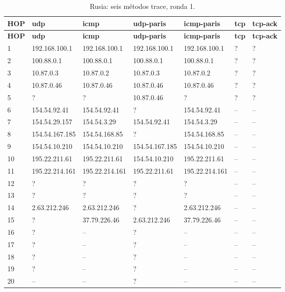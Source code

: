 \begin{landscape}
\begingroup
\fontsize{9}{11}\selectfont
\begin{longtable}{p{0.95cm}p{3.725cm}p{3.725cm}p{3.725cm}p{3.725cm}p{3.725cm}p{3.725cm}}
\caption{Rusia: seis métodos trace, ronda 1.}\label{anexo:trace:37.79.226.46:1} \\
\toprule
\textbf{HOP} & \textbf{udp} & \textbf{icmp} & \textbf{udp-paris} & \textbf{icmp-paris} & \textbf{tcp} & \textbf{tcp-ack} \\ \midrule
\endfirsthead
\toprule
\textbf{HOP} & \textbf{udp} & \textbf{icmp} & \textbf{udp-paris} & \textbf{icmp-paris} & \textbf{tcp} & \textbf{tcp-ack} \\ \midrule
\endhead
1 & 192.168.100.1 & 192.168.100.1 & 192.168.100.1 & 192.168.100.1 & ? & ? \\
2 & 100.88.0.1 & 100.88.0.1 & 100.88.0.1 & 100.88.0.1 & ? & ? \\
3 & 10.87.0.3 & 10.87.0.2 & 10.87.0.3 & 10.87.0.2 & ? & ? \\
4 & 10.87.0.46 & 10.87.0.46 & 10.87.0.46 & 10.87.0.46 & ? & ? \\
5 & ? & ? & 10.87.0.46 & ? & ? & ? \\
6 & 154.54.92.41 & 154.54.92.41 & ? & 154.54.92.41 & -- & -- \\
7 & 154.54.29.157 & 154.54.3.29 & 154.54.92.41 & 154.54.3.29 & -- & -- \\
8 & 154.54.167.185 & 154.54.168.85 & ? & 154.54.168.85 & -- & -- \\
9 & 154.54.10.210 & 154.54.10.210 & 154.54.167.185 & 154.54.10.210 & -- & -- \\
10 & 195.22.211.61 & 195.22.211.61 & 154.54.10.210 & 195.22.211.61 & -- & -- \\
11 & 195.22.214.161 & 195.22.214.161 & 195.22.211.61 & 195.22.214.161 & -- & -- \\
12 & ? & ? & ? & ? & -- & -- \\
13 & ? & ? & ? & ? & -- & -- \\
14 & 2.63.212.246 & 2.63.212.246 & ? & 2.63.212.246 & -- & -- \\
15 & ? & 37.79.226.46 & 2.63.212.246 & 37.79.226.46 & -- & -- \\
16 & ? & -- & ? & -- & -- & -- \\
17 & ? & -- & ? & -- & -- & -- \\
18 & ? & -- & ? & -- & -- & -- \\
19 & ? & -- & ? & -- & -- & -- \\
20 & -- & -- & ? & -- & -- & -- \\
\bottomrule
\end{longtable}
\endgroup
\end{landscape}
